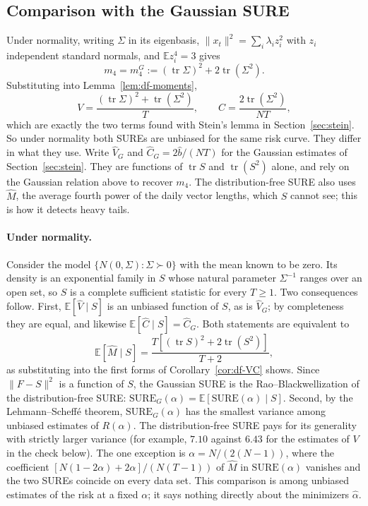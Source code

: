 \subsection{Comparison with the Gaussian SURE}

Under normality, writing $\Sigma$ in its eigenbasis, $\|x_t\|^2 = \sum_i \lambda_i z_i^2$ with $z_i$ independent standard normals, and $\mathbb{E}z_i^4 = 3$ gives
\[
  m_4 = m_4^{G} := (\operatorname{tr}\Sigma)^2 + 2\operatorname{tr}(\Sigma^2).
\]
Substituting into Lemma~\ref{lem:df-moments},
\[
  V = \frac{(\operatorname{tr}\Sigma)^2 + \operatorname{tr}(\Sigma^2)}{T}, \qquad C = \frac{2\operatorname{tr}(\Sigma^2)}{NT},
\]
which are exactly the two terms found with Stein's lemma in Section~\ref{sec:stein}. So under normality both SUREs are unbiased for the same risk curve. They differ in what they use. Write $\hat V_G$ and $\hat C_G = 2\hat b/(NT)$ for the Gaussian estimates of Section~\ref{sec:stein}. They are functions of $\operatorname{tr}S$ and $\operatorname{tr}(S^2)$ alone, and rely on the Gaussian relation above to recover $m_4$. The distribution-free SURE also uses $\hat M$, the average fourth power of the daily vector lengths, which $S$ cannot see; this is how it detects heavy tails.

\paragraph{Under normality.}
Consider the model $\{N(0, \Sigma) : \Sigma \succ 0\}$ with the mean known to be zero. Its density is an exponential family in $S$ whose natural parameter $\Sigma^{-1}$ ranges over an open set, so $S$ is a complete sufficient statistic for every $T \ge 1$. Two consequences follow. First, $\mathbb{E}[\hat V \mid S]$ is an unbiased function of $S$, as is $\hat V_G$; by completeness they are equal, and likewise $\mathbb{E}[\hat C \mid S] = \hat C_G$. Both statements are equivalent to
\[
  \mathbb{E}[\hat M \mid S] = \frac{T\left[(\operatorname{tr}S)^2 + 2\operatorname{tr}(S^2)\right]}{T + 2},
\]
as substituting into the first forms of Corollary~\ref{cor:df-VC} shows. Since $\|F - S\|^2$ is a function of $S$, the Gaussian SURE is the Rao--Blackwellization of the distribution-free SURE: $\mathrm{SURE}_G(\alpha) = \mathbb{E}[\mathrm{SURE}(\alpha) \mid S]$. Second, by the Lehmann--Scheff\'e theorem, $\mathrm{SURE}_G(\alpha)$ has the smallest variance among unbiased estimates of $R(\alpha)$. The distribution-free SURE pays for its generality with strictly larger variance (for example, $7.10$ against $6.43$ for the estimates of $V$ in the check below). The one exception is $\alpha = N/(2(N-1))$, where the coefficient $[N(1-2\alpha) + 2\alpha]/(N(T-1))$ of $\hat M$ in $\mathrm{SURE}(\alpha)$ vanishes and the two SUREs coincide on every data set. This comparison is among unbiased estimates of the risk at a fixed $\alpha$; it says nothing directly about the minimizers $\hat\alpha$.


